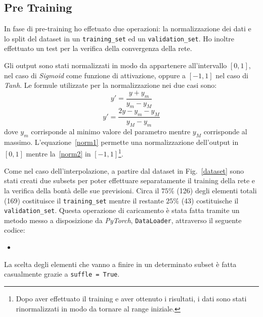 \documentclass[12pt,a4paper,final]{book}
\newcommand{\insertcode}[2]{\begin{itemize}\item[]\end{itemize}} %
\begin{document}

\subsection{Pre Training}\label{pre_training}
In fase di pre-training ho effetuato due operazioni: la normalizzazione dei dati e lo split del dataset in un \texttt{training\_set} ed un \texttt{validation\_set}. Ho inoltre effettuato un test per la verifica della convergenza della rete.


Gli output sono stati normalizzati in modo da appartenere all'intervallo $[0, 1]$, nel caso di \textit{Sigmoid} come funzione di attivazione, oppure a $[-1, 1]$ nel caso di \textit{Tanh}. Le formule utilizzate per la normalizzazione nei due casi sono:
\begin{equation}\label{norm1}
y'=\frac{y+y_m}{y_m-y_M}
\end{equation}
\begin{equation}\label{norm2}
y'=\frac{2y-y_m-y_M}{y_M-y_m}
\end{equation}
dove $y_m$ corrisponde al minimo valore del parametro mentre $y_M$ corrisponde al massimo.
L'equazione~\ref{norm1} permette una normalizzazione dell'output in $[0, 1]$ mentre la~\ref{norm2} in $[-1, 1]$\footnote{Dopo aver effettuato il training e aver ottenuto i risultati, i dati sono stati rinormalizzati in modo da tornare al range iniziale.}.

Come nel caso dell'interpolazione, a partire dal dataset in Fig.~\ref{dataset} sono stati creati due subsets per poter effettuare separatamente il training della rete e la verifica della bontà delle sue previsioni. Circa il $75\%$ (126) degli elementi totali (169) costituisce il \texttt{training\_set} mentre il restante $25\%$ (43) costituische il \texttt{validation\_set}. Questa operazione di caricamento è stata fatta tramite un metodo messo a disposizione da \textit{PyTorch}, \texttt{DataLoader}, attraverso il seguente codice:
\insertcode{../scripts/loader.py}{Loader}\label{loader}
La scelta degli elementi che vanno a finire in un determinato subset è fatta casualmente grazie a \texttt{suffle = True}.
\end{document}
